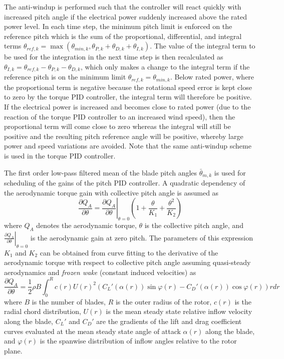The anti-windup is performed such that the controller will react quickly with increased pitch angle if the electrical power suddenly increased above the rated power level. In each time step, the minimum pitch limit is enforced on the reference pitch which is the sum of the proportional, differential, and integral terms $\theta_{ref,k}=\max\left(\theta_{min,k},\theta_{P,k}+\theta_{D,k}+\theta_{I,k}\right)$. The value of the integral term to be used for the integration in the next time step is then recalculated as $\theta_{I,k}=\theta_{ref,k}-\theta_{P,k}-\theta_{D,k}$, which only makes a change to the integral term if the reference pitch is on the minimum limit $\theta_{ref,k}=\theta_{min,k}$. Below rated power, where the proportional term is negative because the rotational speed error is kept close to zero by the torque PID controller, the integral term will therefore be positive. If the electrical power is increased and becomes close to rated power (due to the reaction of the torque PID controller to an increased wind speed), then the proportional term will come close to zero whereas the integral will still be positive and the resulting pitch reference angle will be positive, whereby large power and speed variations are avoided. Note that the same anti-windup scheme is used in the torque PID controller.

The first order low-pass filtered mean of the blade pitch angles $\bar \theta_{m,k}$ is used for scheduling of the gains of the pitch PID controller. A quadratic dependency of the aerodynamic torque gain with collective pitch angle is assumed as
\begin{equation}\label{e:gainsch}
\frac{\partial Q_A}{\partial \theta}= \left. \frac{\partial Q_A}{\partial \theta}\right|_{\theta=0}\left(1 + \frac{\theta}{K_{1}} + \frac{\theta^2}{K_{2}}\right)
\end{equation}
where $Q_A$ denotes the aerodynamic torque, $\theta$ is the collective pitch angle, and $\left. \frac{\partial Q_A}{\partial \theta}\right|_{\theta=0}$ is the aerodynamic gain at zero pitch. The parameters of this expression $K_1$ and $K_2$ can be obtained from curve fitting to the derivative of the aerodynamic torque with respect to collective pitch angle assuming quasi-steady aerodynamics and \emph{frozen wake} (constant induced velocities) as
\begin{equation}\label{e:dqadt}
\frac{\partial Q_A}{\partial \theta} = \frac12 \rho B \int_0^R c(r) U(r)^2 \left(
  C_L'(\alpha(r)) \sin \varphi(r)
- C_D'(\alpha(r)) \cos \varphi(r) \right) r dr
\end{equation}
where $B$ is the number of blades, $R$ is the outer radius of the rotor, $c(r)$ is the radial chord distribution, $U(r)$ is the mean steady state relative inflow velocity along the blade, $C_L'$ and $C_D'$ are the gradients of the lift and drag coefficient curves evaluated at the mean steady state angle of attack $\alpha(r)$ along the blade, and $\varphi(r)$ is the spanwise distribution of inflow angles relative to the rotor plane.

